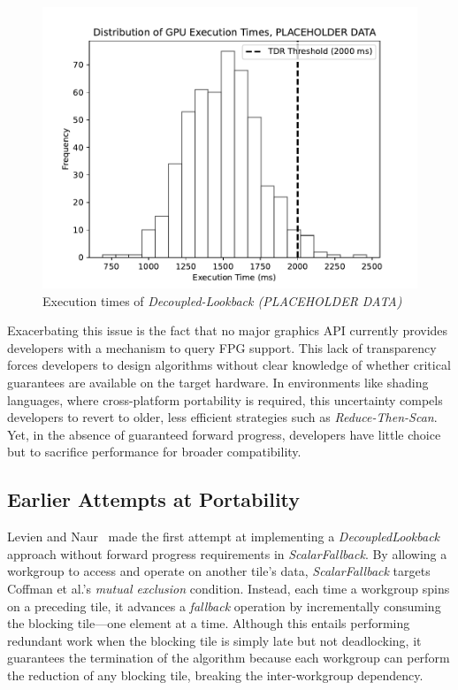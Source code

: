 \documentclass[sigconf]{acmart}
\begin{document}
\begin{figure}[h]
  \centering
  \includegraphics[width=\linewidth]{graphics/Figure_1.pdf}
  \caption{Execution times of \emph{Decoupled-Lookback (PLACEHOLDER DATA)}}
\end{figure}

Exacerbating this issue is the fact that no major graphics API currently provides developers with a mechanism to query FPG support. This lack of transparency forces developers to design algorithms without clear knowledge of whether critical guarantees are available on the target hardware. In environments like shading languages, where cross-platform portability is required, this uncertainty compels developers to revert to older, less efficient strategies such as \emph{Reduce-Then-Scan}. Yet, in the absence of guaranteed forward progress, developers have little choice but to sacrifice performance for broader compatibility.

\subsection{Earlier Attempts at Portability}
Levien and Naur~\cite{Raph2021} made the first attempt at implementing a \emph{DecoupledLookback} approach without forward progress requirements in \emph{ScalarFallback}. By allowing a workgroup to access and operate on another tile’s data, \emph{ScalarFallback} targets Coffman et al.'s \emph{mutual exclusion} condition. Instead, each time a workgroup spins on a preceding tile, it advances a \emph{fallback} operation by incrementally consuming the blocking tile---one element at a time. Although this entails performing redundant work when the blocking tile is simply late but not deadlocking, it guarantees the termination of the algorithm because each workgroup can perform the reduction of any blocking tile, breaking the inter-workgroup dependency.
\end{document}
